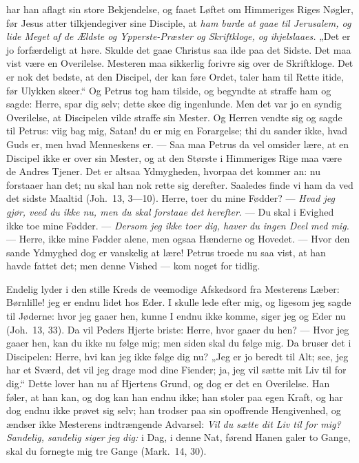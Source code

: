 \documentclass[12pt,a4paper]{book}
\begin{document}
har han aflagt sin store Bekjendelse, og faaet Løftet om Himmeriges Riges Nøgler, før Jesus
atter tilkjendegiver sine Disciple, at \emph{ham burde at gaae til Jerusalem, og lide Meget
af de Ældste og Ypperste-Præster og Skriftkloge, og ihjelslaaes.} „Det er jo forfærdeligt
at høre. Skulde det gaae Christus saa ilde paa det Sidste. Det maa vist være en Overilelse.
Mesteren maa sikkerlig forivre sig over de Skriftkloge. Det er nok det bedste, at den
Discipel, der kan føre Ordet, taler ham til Rette itide, før Ulykken skeer.“ Og Petrus tog
ham tilside, og begyndte at straffe ham og sagde: {\large Herre, spar dig selv; dette skee
dig ingenlunde.} Men det var jo en syndig Overilelse, at Discipelen vilde straffe sin
Mester. Og Herren vendte sig og sagde til Petrus: {\large viig bag mig, Satan! du er mig en
Forargelse; thi du sander ikke, hvad Guds er, men hvad Menneskens er.} --- Saa maa Petrus
da vel omsider lære, at en Discipel ikke er over sin Mester, og at den Største i Himmeriges
Rige maa være de Andres Tjener. Det er altsaa Ydmygheden, hvorpaa det kommer an: nu
forstaaer han det; nu skal han nok rette sig derefter. Saaledes finde vi ham da ved det
sidste Maaltid (Joh.\ 13, 3---10). {\large Herre, toer du mine Fødder?} --- \emph{Hvad jeg
gjør, veed du ikke nu, men du skal forstaae det herefter.} --- {\large Du skal i Evighed
ikke toe mine Fødder.} --- \emph{Dersom jeg ikke toer dig, haver du ingen Deel med mig.}
--- {\large Herre, ikke mine Fødder alene, men ogsaa Hænderne og Hovedet.} --- Hvor den
sande Ydmyghed dog er vanskelig at lære! Petrus troede nu saa vist, at han havde fattet
det; men denne Vished --- kom noget for tidlig.

Endelig lyder i den stille Kreds de veemodige Afskedsord fra Mesterens Læber: {\large
Børnlille! jeg er endnu lidet hos Eder. I skulle lede efter mig, og ligesom jeg sagde til
Jøderne:
hvor jeg gaaer hen, kunne I endnu ikke komme, siger jeg og Eder nu} (Joh.\ 13, 33). Da vil
Peders Hjerte briste: {\large Herre, hvor gaaer du hen? --- Hvor jeg gaaer hen, kan du ikke
nu følge mig; men siden skal du følge mig.} Da bruser det i Discipelen: {\large Herre, hvi
kan jeg ikke følge dig nu?} „Jeg er jo beredt til Alt; see, jeg har et Sværd, det vil jeg
drage mod dine Fiender; ja, jeg vil sætte mit Liv til for dig.“ Dette lover han nu af
Hjertens Grund, og dog er det en Overilelse. Han føler, at han kan, og dog kan han endnu
ikke; han stoler paa egen Kraft, og har dog endnu ikke prøvet sig selv; han trodser paa sin
opoffrende Hengivenhed, og ændser ikke Mesterens indtrængende Advarsel: \emph{Vil du sætte
dit Liv til for mig? Sandelig, sandelig siger jeg dig:} {\large i Dag, i denne Nat, førend
Hanen galer to Gange, skal du fornegte mig tre Gange} (Mark.\ 14, 30).
\end{document}
